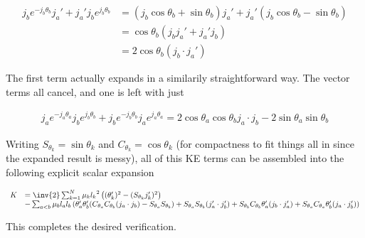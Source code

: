 \begin{align*}
j_b e^{-j_b \theta_b} j_a' + j_a' j_b e^{j_b \theta_b} 
&=
(j_b \cos\theta_b + \sin\theta_b) j_a' + j_a' (j_b \cos\theta_b - \sin\theta_b) \\
&=
\cos\theta_b (j_b j_a' + j_a' j_b ) \\
&=
2 \cos\theta_b (j_b \cdot j_a')
\end{align*}

The first term actually expands in a similarily straightforward way.  The vector terms all cancel, and one is left with just

\begin{align*}
j_a e^{-j_a \theta_a} j_b e^{j_b\theta_b} + j_b e^{-j_b \theta_b} j_a e^{j_a\theta_a} 
= 
2 \cos\theta_a\cos\theta_b j_a \cdot j_b - 2 \sin\theta_a \sin\theta_b 
\end{align*}

Writing $S_{\theta_k} = \sin\theta_k$ and $C_{\theta_k} = \cos\theta_k$ (for compactness to fit things all in since the expanded result is messy), all of this KE terms can be assembled into the following explicit scalar expansion

\begin{equation}\label{eqn:sPolarMultiPendulum:scalarExpansion}
\begin{array}{l l}
K &=
\inv{2}
\sum_{k=1}^N
\mu_k
{l_k}^2
\left( (\theta_k')^2 - (S_{\theta_k} j_k')^2 \right) \\
&-
\sum_{a<b}
\mu_b
l_a l_b
\left(
\theta_a' \theta_b' (C_{\theta_a}C_{\theta_b} (j_a \cdot j_b) - S_{\theta_a} S_{\theta_b} )
+S_{\theta_a} S_{\theta_b} (j_a' \cdot j_b')
+S_{\theta_b} C_{\theta_b} \theta_a' (j_b \cdot j_a')
+S_{\theta_a} C_{\theta_a} \theta_b' (j_a \cdot j_b')
\right)
\end{array}
\end{equation}

This completes the desired verification.

\EndNoBibArticle
